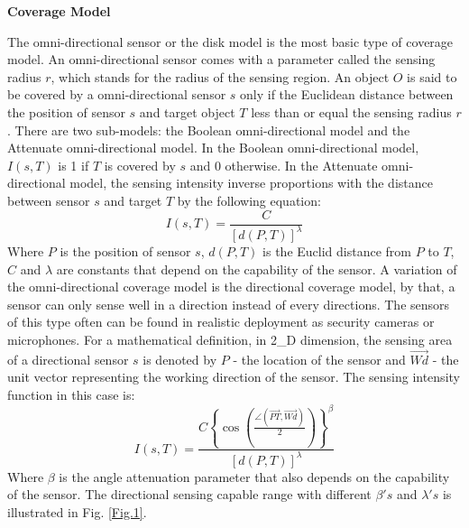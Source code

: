 \documentclass[final]{elsarticle}
\begin{document}
\textbf{Coverage Model}

The omni-directional sensor or the disk model is the most basic type of coverage model. An omni-directional sensor comes with a parameter called the sensing radius $r$, which stands for the radius of the sensing region. An object $ O $ is said to be covered by a omni-directional sensor $ s $ only if the Euclidean distance between the position of sensor $ s $ and target object $ T $ less than or equal the sensing radius $r$. There are two sub-models: the Boolean omni-directional model and the Attenuate omni-directional model. In the Boolean omni-directional model, $I(s, T)$ is 1 if $ T $ is covered by $ s $ and 0 otherwise. In the Attenuate omni-directional model, the sensing intensity inverse proportions with the distance between sensor $ s $ and target $ T $ by the following equation:
\begin{equation}
\label{eqfo}
I({s},T) = \frac{C}{{{{\left[ {d(P,T)} \right]}^\lambda }}}
\end{equation}
Where $ P $ is the position of sensor $ s $, $ d(P,T) $ is the Euclid distance from $ P $ to $ T $, $ C $ and $ \lambda $ are constants that depend on the capability of the sensor. 
A variation of the omni-directional coverage model is the directional coverage model, by that, a sensor can only sense well in a direction instead of every directions. The sensors of this type often can be found in realistic deployment as security cameras or microphones.  For a mathematical definition, in 2\_D dimension, the sensing area of a directional sensor $ s $ is denoted by $ P $ - the location of the sensor and $ \overrightarrow{Wd}$ - the unit vector representing the working direction of the sensor. The sensing intensity function in this case is:
\begin{equation}
\label{eqfd}
I({s},T) = \frac{{C{{\left\{ {\cos \left( {\frac{{\angle (\overrightarrow {PT} ,\overrightarrow {Wd}) }}{2}} \right)} \right\}}^\beta }}}{{{{\left[ {d(P,T)} \right]}^\lambda }}}
\end{equation}
Where $\beta$ is the angle attenuation parameter that also depends on the capability of the sensor. The directional sensing capable range with different $ \beta's $ and $ \lambda's $ is illustrated in Fig. \ref{Fig.1}. \\
\end{document}
